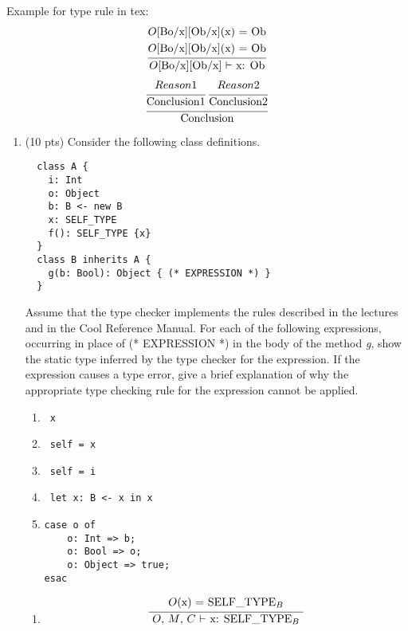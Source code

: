 \documentclass[10pt]{article}
\newcommand{\infertext}[2]{\infer{{\textrm{#2}}}{\begin{aligned}#1\end{aligned}}}
\begin{document}
Example for type rule in tex:
\[\infertext
		  {& \textrm{$O$[Bo/x][Ob/x](x) = Ob} \\ & \textrm{$O$[Bo/x][Ob/x](x) = Ob}}
		  {$O$[Bo/x][Ob/x] $\vdash$ x: Ob}
\]
\begin{equation}
	\infertext
		{\textrm{\infertext{Reason1}{Conclusion1} \infertext{Reason2}{Conclusion2}}}
		{Conclusion}
\end{equation}
\begin{enumerate}
\item (10 pts) Consider the following class definitions.
\begin{verbatim}
  class A {
	i: Int
	o: Object
	b: B <- new B
	x: SELF_TYPE
	f(): SELF_TYPE {x}
  }
  class B inherits A {
	g(b: Bool): Object { (* EXPRESSION *) }
  }
\end{verbatim}

Assume that the type checker implements the rules described in the lectures and in the Cool Reference
Manual. For each of the following expressions, occurring in place of (* EXPRESSION *) in the body
of the method \emph{g}, show the static type inferred by the type checker for the expression. If the expression
causes a type error, give a brief explanation of why the appropriate type checking rule for the expression
cannot be applied.

\begin{enumerate}
  \item \begin{verbatim} x \end{verbatim}
  \item \begin{verbatim} self = x \end{verbatim}
  \item \begin{verbatim} self = i \end{verbatim}
  \item \begin{verbatim} let x: B <- x in x \end{verbatim}
  \item \begin{verbatim}
case o of
	o: Int => b;
	o: Bool => o;
	o: Object => true;
esac
\end{verbatim}
\end{enumerate}
\begin{enumerate}
	\item\begin{equation} \infertext {
		\textrm{$O$(x) = SELF\_TYPE$_B$}
	}{
		$O$, $M$, $C$ $\vdash$ x: SELF\_TYPE$_B$
	}\end{equation}



\end{enumerate}
\end{enumerate}
\end{document}
